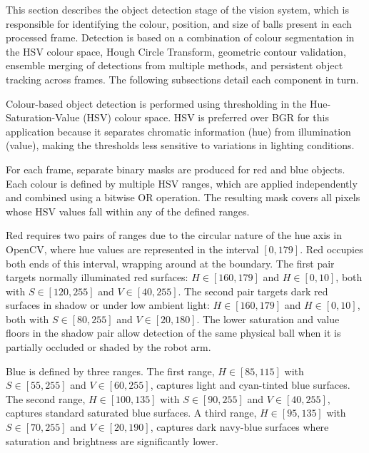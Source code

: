 
This section describes the object detection stage of the vision system,
which is responsible for identifying the colour, position, and size of
balls present in each processed frame. Detection is based on a combination
of colour segmentation in the HSV colour space, Hough Circle Transform,
geometric contour validation, ensemble merging of detections from multiple
methods, and persistent object tracking across frames. The following
subsections detail each component in turn.


Colour-based object detection is performed using thresholding in the
Hue-Saturation-Value (HSV) colour space. HSV is preferred over BGR for this
application because it separates chromatic information (hue) from illumination
(value), making the thresholds less sensitive to variations in lighting conditions.

For each frame, separate binary masks are produced for red and blue objects. Each
colour is defined by multiple HSV ranges, which are applied independently and
combined using a bitwise OR operation. The resulting mask covers all pixels whose
HSV values fall within any of the defined ranges.

Red requires two pairs of ranges due to the circular nature of the hue axis in
OpenCV, where hue values are represented in the interval $[0, 179]$. Red occupies
both ends of this interval, wrapping around at the boundary. The first pair targets
normally illuminated red surfaces: $H \in [160, 179]$ and $H \in [0, 10]$, both
with $S \in [120, 255]$ and $V \in [40, 255]$. The second pair targets dark red
surfaces in shadow or under low ambient light: $H \in [160, 179]$ and
$H \in [0, 10]$, both with $S \in [80, 255]$ and $V \in [20, 180]$. The lower
saturation and value floors in the shadow pair allow detection of the same physical
ball when it is partially occluded or shaded by the robot arm.

Blue is defined by three ranges. The first range, $H \in [85, 115]$ with
$S \in [55, 255]$ and $V \in [60, 255]$, captures light and cyan-tinted blue
surfaces. The second range, $H \in [100, 135]$ with $S \in [90, 255]$ and
$V \in [40, 255]$, captures standard saturated blue surfaces. A third range,
$H \in [95, 135]$ with $S \in [70, 255]$ and $V \in [20, 190]$, captures dark
navy-blue surfaces where saturation and brightness are significantly lower.

